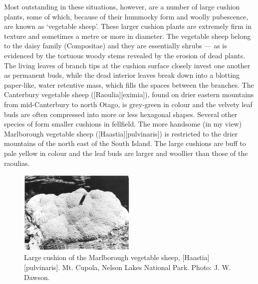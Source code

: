 Most outstanding in these situations, however, are a number of large cushion plants, some of which, because of their hummocky form and woolly pubescence, are known as `vegetable sheep'.
These larger cushion plants are extremely firm in texture and sometimes a metre or more in diameter.
The vegetable sheep belong to the daisy family (Compositae) and they are essentially shrubs --- as is evidenced by the tortuous woody stems revealed by the erosion of dead plants.
The living leaves of branch tips at the cushion surface closely invest one another as permanent buds, while the dead interior leaves break down into a blotting paper-like, water retentive mass, which fills the spaces between the branches.
The Canterbury vegetable sheep ([Raoulia][eximia]), found on drier eastern mountains from mid-Canterbury to north Otago, is grey-green in colour and the velvety leaf buds are often compressed into more or less hexagonal shapes.
Several other species of  form smaller cushions in fellfield.
The more handsome (in my view) Marlborough vegetable sheep ([Haastia][pulvinaris]) is restricted to the drier mountains of the north east of the South Island.
The large cushions are buff to pale yellow in colour and the leaf buds are larger and woollier than those of the raoulias.

\begin{figure}
	\includegraphics[width=0.5\textwidth]{graphics/figure108vegetable-sheep.jpg}
	\centering
	\caption[Large cushion of the Marlborough vegetable sheep]{Large cushion of the Marlborough vegetable sheep, [Haastia][pulvinaris].
	Mt. Cupola, Nelson Lakes National Park.
	Photo: J. W. Dawson.}%
	\label{fig:108vegetable-sheep}
\end{figure}

